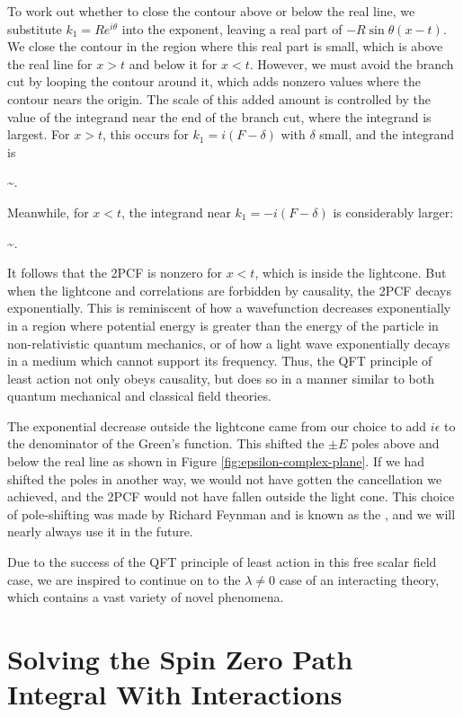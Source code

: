 To work out whether to close the contour above or below the real line, we substitute $k_1 = Re^{i\theta}$ into the exponent, leaving a real part of $-R\sin\theta(x - t)$. We close the contour in the region where this real part is small, which is above the real line for $x>t$ and below it for $x<t$. However, we must avoid the branch cut by looping the contour around it, which adds nonzero values where the contour nears the origin. The scale of this added amount is controlled by the value of the integrand near the end of the branch cut, where the integrand is largest. For $x>t$, this occurs for $k_1 = i(F - \delta)$ with $\delta$ small, and the integrand is
\begin{e}
  \sim{}.
\end{e}
Meanwhile, for $x<t$, the integrand near $k_1 = -i(F - \delta)$ is considerably larger:
\begin{e}
  \sim{}.
\end{e}
It follows that the 2PCF is nonzero for $x<t$, which is inside the lightcone. But when the lightcone and correlations are forbidden by causality, the 2PCF decays exponentially. This is reminiscent of how a wavefunction decreases exponentially in a region where potential energy is greater than the energy of the particle in non-relativistic quantum mechanics, or of how a light wave exponentially decays in a medium which cannot support its frequency. Thus, the QFT principle of least action not only obeys causality, but does so in a manner similar to both quantum mechanical and classical field theories.

The exponential decrease outside the lightcone came from our choice to add $i\epsilon$ to the denominator of the Green's function. This shifted the $\pm E$ poles above and below the real line as shown in Figure \ref{fig:epsilon-complex-plane}. If we had shifted the poles in another way, we would not have gotten the cancellation we achieved, and the 2PCF would not have fallen outside the light cone. This choice of pole-shifting was made by Richard Feynman and is known as the , and we will nearly always use it in the future.

Due to the success of the QFT principle of least action in this free scalar field case, we are inspired to continue on to the $\lambda \neq 0$ case of an interacting theory, which contains a vast variety of novel phenomena.


\section{Solving the Spin Zero Path Integral With Interactions}

